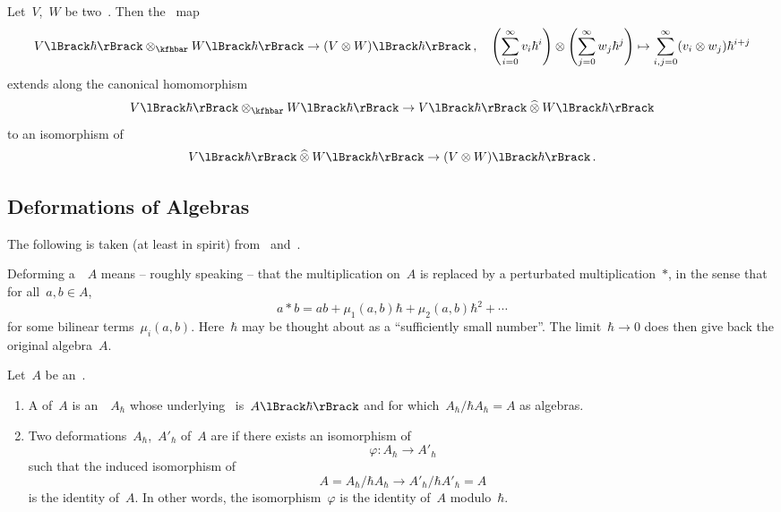 \documentclass[a4paper, 11pt, oneside]{scrartcl}
\begin{document}
\begin{proposition}
  Let~$V$,~$W$ be two~\vectorspaces{$\kf$}.
  Then the~\linear{$\kfhbar$} map
  \[
    \power{V}{\hbar} \tensor_{\kfhbar} \power{W}{\hbar}
    \to
    \power{(V \tensor W)}{\hbar} \,,
    \quad
    \Biggl( \sum_{i=0}^\infty v_i \hbar^i \Biggr)
    \tensor
    \Biggl( \sum_{j=0}^\infty w_j \hbar^j \Biggr)
    \mapsto
    \sum_{i,j=0}^\infty (v_i \tensor w_j) \hbar^{i+j}
  \]
  extends along the canonical homomorphism
  \[
    \power{V}{\hbar} \tensor_{\kfhbar} \power{W}{\hbar}
    \to
    \power{V}{\hbar} \ctensor \power{W}{\hbar}
  \]
  to an isomorphism of~\modules{$\kfhbar$}
  \[
    \power{V}{\hbar} \ctensor \power{W}{\hbar}
    \to
    \power{(V \tensor W)}{\hbar} \,.
  \]
\end{proposition}



\subsection{Deformations of Algebras}

The following is taken (at least in spirit) from~\cite[\S 5.2]{pieter_hochschild} and~\cite{gerstenhaber_quantum}.

\begin{motivation}
  Deforming a~\algebra{$\kf$}~$A$ means -- roughly speaking -- that the multiplication on~$A$ is replaced by a perturbated multiplication~$*$, in the sense that for all~$a, b \in A$,
  \[
    a * b
    =
    ab + \mu_1(a,b) \hbar + \mu_2(a,b) \hbar^2 + \dotsb
  \]
  for some bilinear terms~$\mu_i(a,b)$.
  Here~$\hbar$ may be thought about as a \enquote{sufficiently small number}.
  The limit~$\hbar \to 0$ does then give back the original algebra~$A$.
\end{motivation}

\begin{definition}
  \label{definition of algebra deformations}
  Let~$A$ be an~\algebra{$\kf$}.
  \begin{enumerate}
    \item
      A  of~$A$ is an~\algebra{$\kfhbar$}~$A_\hbar$ whose underlying~\module{$\kfhbar$} is~$\power{A}{\hbar}$ and for which~$A_\hbar / \hbar A_\hbar = A$ as algebras.
    \item
      Two deformations~$A_\hbar$,~$A'_\hbar$ of~$A$ are  if there exists an isomorphism of~\algebras{$\kfhbar$}
      \[
        \varphi
        \colon
        A_\hbar
        \to
        A'_\hbar
      \]
      such that the induced isomorphism of~\algebras{$\kf$}
      \[
        A
        =
        A_\hbar / \hbar A_\hbar
        \to
        A'_\hbar / \hbar A'_\hbar
        = A
      \]
      is the identity of~$A$.
      In other words, the isomorphism~$\varphi$ is the identity of~$A$ modulo~$\hbar$.
  \end{enumerate}
\end{definition}
\end{document}

